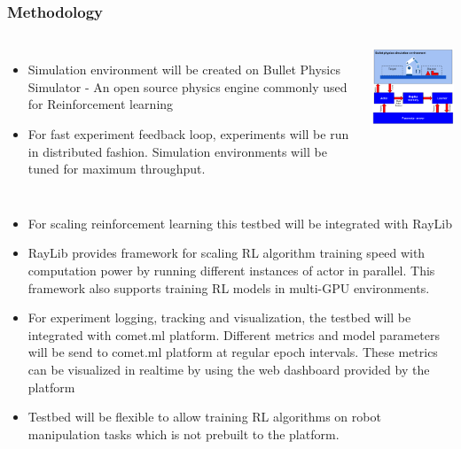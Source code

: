 \documentclass{beamer}
\begin{document}
	\begin{frame}[allowframebreaks]
		\frametitle{Methodology}
		
		\begin{columns}[c]
			\begin{itemize}
				\item Simulation environment will be created on Bullet Physics Simulator - An open source physics engine commonly used for Reinforcement learning
				\item For fast experiment feedback loop, experiments will be run in distributed fashion. Simulation environments will be tuned for maximum throughput.
			\end{itemize}
			
			\includegraphics[width=6cm]{setup}
		\end{columns}
	

		\begin{itemize}
			\item For scaling reinforcement learning this testbed will be integrated with RayLib
			\item RayLib provides framework for scaling RL algorithm training speed with computation power by running different instances of actor in parallel. This framework also supports training RL models in multi-GPU environments.
			\item For experiment logging, tracking and visualization, the testbed will be integrated with comet.ml platform. Different metrics and model parameters will be send to comet.ml platform at regular epoch intervals. These metrics can be visualized in realtime by using the web dashboard provided by the platform
			\item Testbed will be flexible to allow training RL algorithms on robot manipulation tasks which is not prebuilt to the platform.
		\end{itemize}
	\end{frame}
\end{document}
